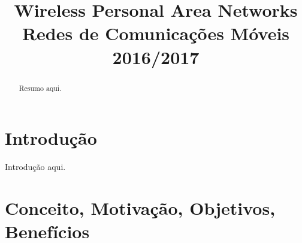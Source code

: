 \documentclass[conference]{IEEEtran}
\begin{document}
\title{Wireless Personal Area Networks\\
  \large Redes de Comunicações Móveis\\
  2016/2017
}

\author{
\and
{}
}

\maketitle

\begin{abstract}
Resumo aqui.
\end{abstract}


\IEEEpeerreviewmaketitle


\section{Introdução}
Introdução aqui.



\section{Conceito, Motivação, Objetivos, Benefícios}
\end{document}
